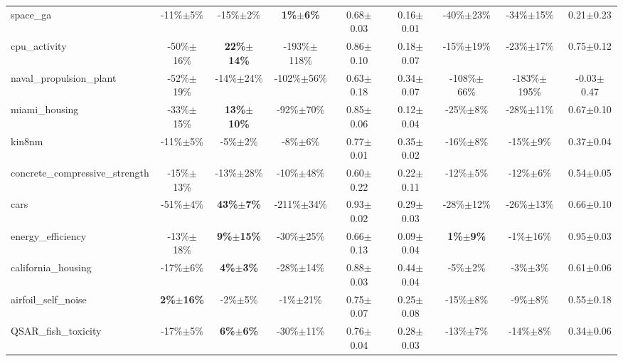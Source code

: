 \begin{table}
\begin{small}
\begin{sc}
{\begin{tabular}{lcccccccc}
space\_ga  &  -11\%$\pm$5\%  &  -15\%$\pm$2\%  &  \textbf{1\%$\pm$6\%}  &  0.68$\pm$0.03  &  0.16$\pm$0.01  &  -40\%$\pm$23\%  &  -34\%$\pm$15\%  &  0.21$\pm$0.23 \\
cpu\_activity  &  -50\%$\pm$16\%  &  \textbf{22\%$\pm$14\%}  &  -193\%$\pm$118\%  &  0.86$\pm$0.10  &  0.18$\pm$0.07  &  -15\%$\pm$19\%  &  -23\%$\pm$17\%  &  0.75$\pm$0.12 \\
naval\_propulsion\_plant  &  -52\%$\pm$19\%  &  -14\%$\pm$24\%  &  -102\%$\pm$56\%  &  0.63$\pm$0.18  &  0.34$\pm$0.07  &  -108\%$\pm$66\%  &  -183\%$\pm$195\%  &  -0.03$\pm$0.47 \\
miami\_housing  &  -33\%$\pm$15\%  &  \textbf{13\%$\pm$10\%}  &  -92\%$\pm$70\%  &  0.85$\pm$0.06  &  0.12$\pm$0.04  &  -25\%$\pm$8\%  &  -28\%$\pm$11\%  &  0.67$\pm$0.10 \\
kin8nm  &  -11\%$\pm$5\%  &  -5\%$\pm$2\%  &  -8\%$\pm$6\%  &  0.77$\pm$0.01  &  0.35$\pm$0.02  &  -16\%$\pm$8\%  &  -15\%$\pm$9\%  &  0.37$\pm$0.04 \\
concrete\_compressive\_strength  &  -15\%$\pm$13\%  &  -13\%$\pm$28\%  &  -10\%$\pm$48\%  &  0.60$\pm$0.22  &  0.22$\pm$0.11  &  -12\%$\pm$5\%  &  -12\%$\pm$6\%  &  0.54$\pm$0.05 \\
cars  &  -51\%$\pm$4\%  &  \textbf{43\%$\pm$7\%}  &  -211\%$\pm$34\%  &  0.93$\pm$0.02  &  0.29$\pm$0.03  &  -28\%$\pm$12\%  &  -26\%$\pm$13\%  &  0.66$\pm$0.10 \\
energy\_efficiency  &  -13\%$\pm$18\%  &  \textbf{9\%$\pm$15\%}  &  -30\%$\pm$25\%  &  0.66$\pm$0.13  &  0.09$\pm$0.04  &  \textbf{1\%$\pm$9\%}  &  -1\%$\pm$16\%  &  0.95$\pm$0.03 \\
california\_housing  &  -17\%$\pm$6\%  &  \textbf{4\%$\pm$3\%}  &  -28\%$\pm$14\%  &  0.88$\pm$0.03  &  0.44$\pm$0.04  &  -5\%$\pm$2\%  &  -3\%$\pm$3\%  &  0.61$\pm$0.06 \\
airfoil\_self\_noise  &  \textbf{2\%$\pm$16\%}  &  -2\%$\pm$5\%  &  -1\%$\pm$21\%  &  0.75$\pm$0.07  &  0.25$\pm$0.08  &  -15\%$\pm$8\%  &  -9\%$\pm$8\%  &  0.55$\pm$0.18 \\
QSAR\_fish\_toxicity  &  -17\%$\pm$5\%  &  \textbf{6\%$\pm$6\%}  &  -30\%$\pm$11\%  &  0.76$\pm$0.04  &  0.28$\pm$0.03  &  -13\%$\pm$7\%  &  -14\%$\pm$8\%  &  0.34$\pm$0.06 \\

\bottomrule
\end{tabular}
}
\end{sc}
\end{small}
\end{table}
